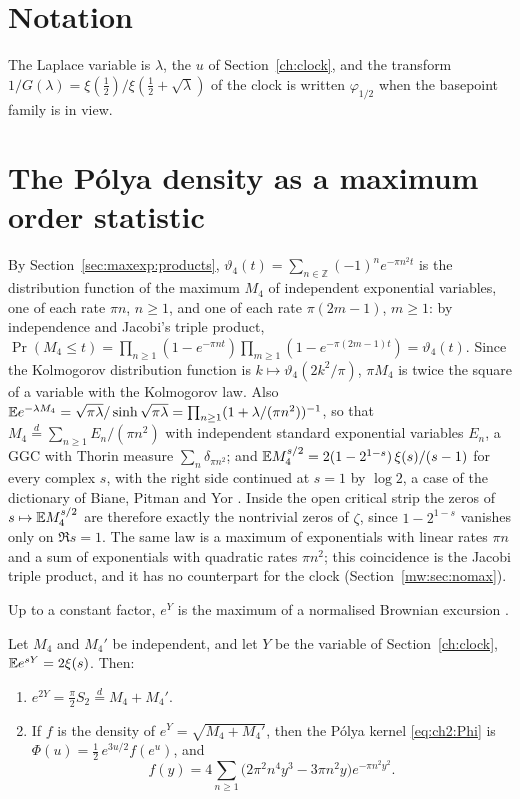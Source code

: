 \section{Notation}\label{mw:sec:notation}

The Laplace variable is $\lambda$, the $u$ of Section~\ref{ch:clock}, and the transform $1/G(\lambda)=\xi(\frac12)/\xi(\frac12+\sqrt\lambda)$ of the clock is written $\varphi_{1/2}$ when the basepoint family is in view.

\section{The P\'olya density as a maximum order statistic}\label{mw:sec:max}

By Section~\ref{sec:maxexp:products}, $\vartheta_4(t)=\sum_{n\in\mathbb Z}(-1)^ne^{-\pi n^2t}$ is the distribution function of the maximum $M_4$ of independent exponential variables, one of each rate $\pi n$, $n\ge1$, and one of each rate $\pi(2m-1)$, $m\ge1$: by independence and Jacobi's triple product, $\Pr(M_4\le t)=\prod_{n\ge1}(1-e^{-\pi nt})\prod_{m\ge1}(1-e^{-\pi(2m-1)t})=\vartheta_4(t)$. Since the Kolmogorov distribution function is $k\mapsto\vartheta_4(2k^2/\pi)$, $\pi M_4$ is twice the square of a variable with the Kolmogorov law. Also $\mathbb{E} e^{-\lambda M_4}=\sqrt{\pi\lambda}/\sinh\sqrt{\pi\lambda}=\prod_{n\ge1}(1+\lambda/(\pi n^2))^{-1}$, so that $M_4\stackrel{d}{=}\sum_{n\ge1}E_n/(\pi n^2)$ with independent standard exponential variables $E_n$, a GGC with Thorin measure $\sum_n\delta_{\pi n^2}$; and $\mathbb{E} M_4^{s/2}=2(1-2^{1-s})\,\xi(s)/(s-1)$ for every complex $s$, with the right side continued at $s=1$ by $\log2$, a case of the dictionary of Biane, Pitman and Yor \cite{BPY01}. Inside the open critical strip the zeros of $s\mapsto\mathbb{E} M_4^{s/2}$ are therefore exactly the nontrivial zeros of $\zeta$, since $1-2^{1-s}$ vanishes only on $\Re s=1$. The same law is a maximum of exponentials with linear rates $\pi n$ and a sum of exponentials with quadratic rates $\pi n^2$; this coincidence is the Jacobi triple product, and it has no counterpart for the clock (Section~\ref{mw:sec:nomax}).

Up to a constant factor, $e^Y$ is the maximum of a normalised Brownian excursion \cite{BPY01}.

\begin{proposition}\label{mw:prop:sum}
Let $M_4$ and $M_4'$ be independent, and let $Y$ be the variable of Section~\ref{ch:clock}, $\mathbb{E} e^{sY}=2\xi(s)$. Then:
\begin{enumerate}
\item[(i)] $e^{2Y}=\frac\pi2S_2\stackrel{d}{=}M_4+M_4'$.
\item[(ii)] If $f$ is the density of $e^Y=\sqrt{M_4+M_4'}$, then the P\'olya kernel \eqref{eq:ch2:Phi} is $\Phi(u)=\frac12\,e^{3u/2}f(e^u)$, and
\[
f(y)=4\sum_{n\ge1}\bigl(2\pi^2n^4y^3-3\pi n^2y\bigr)e^{-\pi n^2y^2}.
\]
\end{enumerate}
\end{proposition}

